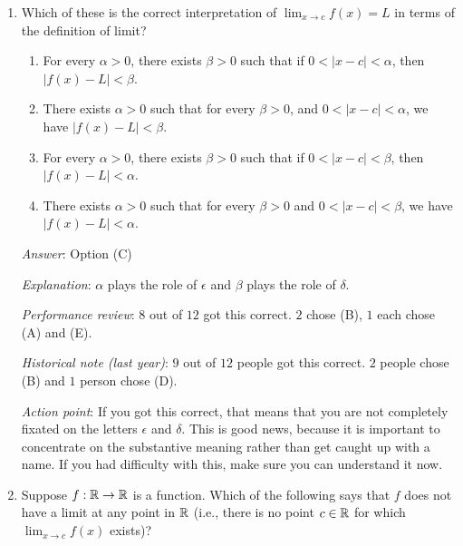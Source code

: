 \documentclass[10pt]{amsart}
\begin{document}
\begin{enumerate}

\item Which of these is the correct interpretation of $\lim_{x \to c} f(x)
  = L$ in terms of the definition of limit?

  \begin{enumerate}
  \item For every $\alpha > 0$, there exists $\beta > 0$ such that if
    $0 < |x - c| < \alpha$, then $|f(x) - L| < \beta$.
  \item There exists $\alpha > 0$ such that for every $\beta > 0$, and
    $0 < |x - c| < \alpha$, we have $|f(x) - L| < \beta$.
  \item For every $\alpha > 0$, there exists $\beta > 0$ such that if
    $0 < |x - c| < \beta$, then $|f(x) - L| < \alpha$.
  \item There exists $\alpha > 0$ such that for every $\beta > 0$ and
    $0 < |x - c| < \beta$, we have $|f(x) - L| < \alpha$.
  \end{enumerate}

  {\em Answer}: Option (C)

  {\em Explanation}: $\alpha$ plays the role of $\epsilon$ and $\beta$
  plays the role of $\delta$.

  {\em Performance review}: $8$ out of $12$ got this correct. $2$
  chose (B), $1$ each chose (A) and (E).

  {\em Historical note (last year)}: $9$ out of $12$ people got this
  correct. $2$ people chose (B) and $1$ person chose (D).

  {\em Action point}: If you got this correct, that means that you are
  not completely fixated on the letters $\epsilon$ and $\delta$. This
  is good news, because it is important to concentrate on the
  substantive meaning rather than get caught up with a name. If you
  had difficulty with this, make sure you can understand it now.

\item Suppose $f:\mathbb{R} \to \mathbb{R}$ is a function. Which of the following says
  that $f$ does not have a limit at any point in $\mathbb{R}$ (i.e., there is
  no point $c \in \mathbb{R}$ for which $\lim_{x \to c} f(x)$ exists)?


\end{enumerate}
\end{document}

